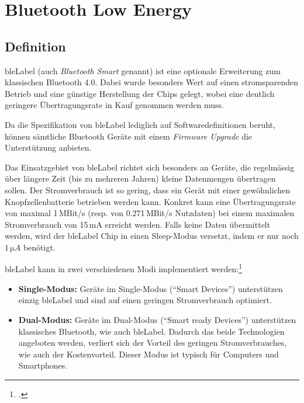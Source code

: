 \chapter{Bluetooth Low Energy}
\label{ch:ble}


\section{Definition}
\gls{bleLabel} (auch \textit{Bluetooth Smart} genannt) ist eine optionale Erweiterung zum klassischen Bluetooth 4.0.
Dabei wurde besonders Wert auf einen stromsparenden Betrieb und eine günstige Herstellung der Chips gelegt, wobei eine deutlich geringere Übertragungsrate in Kauf genommen werden muss.

Da die Spezifikation von \gls{bleLabel} lediglich auf Softwaredefinitionen beruht, können sämtliche Bluetooth Geräte mit einem \textit{Firmware Upgrade} die Unterstützung anbieten.

Das Einsatzgebiet von \gls{bleLabel} richtet sich besonders an Geräte, die regelmässig über längere Zeit (bis zu mehreren Jahren) kleine Datenmengen übertragen sollen.
Der Stromverbrauch ist so gering, dass ein Gerät mit einer gewöhnlichen Knopfzellenbatterie betrieben werden kann. Konkret kann eine Übertragungsrate von maximal 1\,MBit/s (resp. von 0.271\,MBit/s Nutzdaten) bei einem maximalen Stromverbrauch von 15\,mA erreicht werden.
Falls keine Daten übermittelt werden, wird der \gls{bleLabel} Chip in einen Sleep-Modus versetzt, indem er nur noch $1\,\si{\micro A}$ benötigt.

\gls{bleLabel} kann in zwei verschiedenen Modi implementiert werden:\footcite{Bluetooth_Low_Energy_vs_Classic_Bluetooth_Medical_Electronics_Design_2015-04-27}
\begin{itemize}
	\item \textbf{Single-Modus:} Geräte im Single-Modus ("`Smart Devices"') unterstützen einzig \gls{bleLabel} und sind auf einen geringen Stromverbrauch optimiert.
	\item \textbf{Dual-Modus:} Geräte im Dual-Modus ("`Smart ready Devices"') unterstützen klassisches Bluetooth, wie auch \gls{bleLabel}. Dadurch das beide Technologien angeboten werden, verliert sich der Vorteil des geringen Stromverbrauches, wie auch der Kostenvorteil. Dieser Modus ist typisch für Computers und Smartphones.
\end{itemize}


